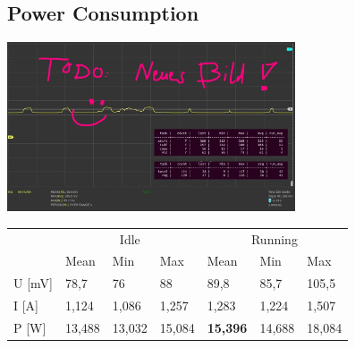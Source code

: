 \documentclass{beamer}
\begin{document}

\subsection{Power Consumption}
\begin{frame}{\subsecname}
\centering
\includegraphics[height=5cm]{images/power_consumption.jpg}\\\vspace{0.3cm}
\begin{tabular}{lllllll}
\toprule
& \multicolumn{3}{c}{Idle} & \multicolumn{3}{c}{Running} \\
& Mean & Min & Max & Mean & Min & Max \\
\midrule
U [mV] & 78,7 & 76 & 88 & 89,8 & 85,7 & 105,5 \\
I [A] & 1,124 & 1,086 & 1,257 & 1,283 & 1,224 & 1,507 \\
P [W] & 13,488 & 13,032 & 15,084 & \textbf{15,396} & 14,688 & 18,084 \\
\bottomrule
\end{tabular}
\end{frame}
\end{document}
